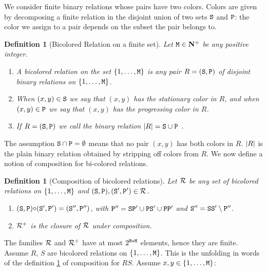 \documentclass{lmcs}
\newtheorem{definition}[theorem]{Definition}
\begin{document}
\newcommand{\MaxInd}{{\tt M}}

We consider finite binary relations whose pairs have two colors.
Colors are given by decomposing a finite 
relation in the disjoint union of two sets ${\tt S}$ and ${\tt P}$: the color we assign to 
a pair depends on the subset the pair belongs to.

\begin{definition}[Bicolored  Relation on a finite set]
\label{definition-bicolored-relation}
Let $\MaxInd \in \N^+$ be any positive integer. 
 \begin{enumerate}
\item
A bicolored relation on the set $\{1, \ldots, \MaxInd\}$ is any pair
$R = ({\tt S},{\tt P})$ of \emph{disjoint} binary relations on $\{1, \ldots, \MaxInd\}$. 
\item
When $(x,y) \in {\tt S}$ we say that $(x,y)$ has the \emph{stationary} color in $R$, 
and when $(x,y) \in {\tt P}$ we say that $(x,y)$ has the \emph{progressing} color in $R$.
\item
If $R = ({\tt S},{\tt P})$ we call the binary relation ${| R |} = {\tt S} \cup {\tt P}$ 
. 
\end{enumerate}
\end{definition}

The assumption ${\tt S} \cap {\tt P} =\emptyset$ means that no pair $(x,y)$ has both colors in 
$R$.  ${| R |}$ is the plain binary relation obtained by stripping off colors from $R$. 
We now define a notion of composition for bi-colored relations.

\begin{definition}[Composition of bicolored  relations]
\label{definition-composition}
Let ${\mathcal R}$ be any set of bicolored relations on $\{1, \ldots, \MaxInd\}$ and 
$({\tt S},{\tt P}), ({\tt S}',{\tt P}') \in {\mathcal R}$.
 \begin{enumerate}
\item
$({\tt S},{\tt P}) {\circ} ({\tt S}',{\tt P}') = ({\tt S}'',{\tt P}'')$,
with ${\tt P}''={\tt S}{\tt P}' \cup {\tt P}{\tt S}'\cup {\tt P}{\tt P}'$ 
and ${\tt S}'' = {\tt S}{\tt S}'\setminus {\tt P}''$.
\item
${\mathcal R}^+$ is the closure of ${\mathcal R}$ under composition.
\end{enumerate}
\end{definition}

The families ${\mathcal R}$ and ${\mathcal R}^+$  have at most $2^{\MaxInd*\MaxInd}$ 
elements, hence they are finite. 
Assume $R$, $S$ are bicolored relations on $\{1, \ldots, \MaxInd\}$. 
This is the unfolding in words of the definition \ref{definition-composition}
of composition for $RS$. Assume $x, y \in \{1, \ldots, \MaxInd\}$:
\end{document}
